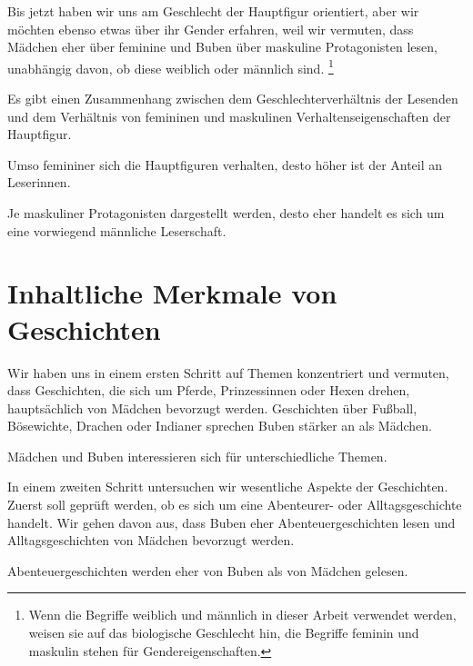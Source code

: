 Bis jetzt haben wir uns am Geschlecht der Hauptfigur orientiert, aber
wir möchten ebenso etwas über ihr Gender erfahren, weil wir vermuten,
dass Mädchen eher über feminine und Buben über maskuline Protagonisten
lesen, unabhängig davon, ob diese weiblich oder männlich sind.
\footnote{Wenn die Begriffe weiblich und männlich in dieser Arbeit verwendet werden, weisen sie auf das biologische Geschlecht hin, die Begriffe feminin und maskulin stehen für Gendereigenschaften.}

\begin{hyp}\label{h3} Es gibt einen Zusammenhang zwischen dem Geschlechterverhältnis der Lesenden und dem Verhältnis von femininen und maskulinen Verhaltenseigenschaften der Hauptfigur. \end{hyp}

\begin{subhyp}\label{h3.1} 
  Umso femininer sich die Hauptfiguren verhalten, desto höher ist der Anteil an Leserinnen.\end{subhyp}

\begin{subhyp}\label{h3.2} Je maskuliner Protagonisten dargestellt werden, desto eher handelt es sich um eine vorwiegend männliche Leserschaft.\end{subhyp}

\section{Inhaltliche Merkmale von Geschichten}

Wir haben uns in einem ersten Schritt auf Themen konzentriert und
vermuten, dass Geschichten, die sich um Pferde, Prinzessinnen oder Hexen
drehen, hauptsächlich von Mädchen bevorzugt werden. Geschichten über
Fußball, Bösewichte, Drachen oder Indianer sprechen Buben stärker an als
Mädchen.

\begin{hyp}\label{hyp:themen} Mädchen und Buben interessieren sich für unterschiedliche Themen. \end{hyp}

In einem zweiten Schritt untersuchen wir wesentliche Aspekte der
Geschichten. Zuerst soll geprüft werden, ob es sich um eine Abenteurer-
oder Alltagsgeschichte handelt. Wir gehen davon aus, dass Buben eher
Abenteuergeschichten lesen und Alltagsgeschichten von Mädchen bevorzugt
werden.

\begin{subhyp}\label{h4.1} Abenteuergeschichten werden eher von Buben als von Mädchen gelesen. \end{subhyp}

